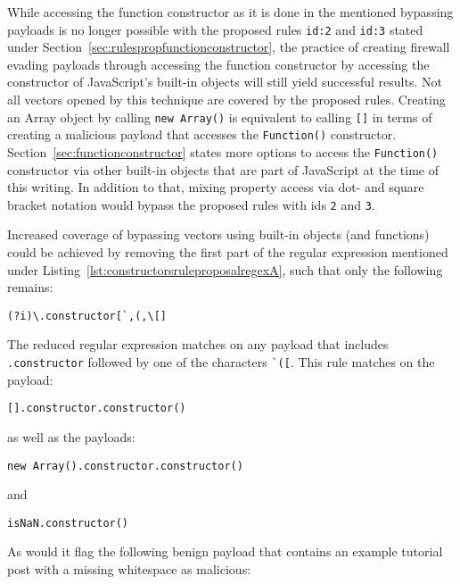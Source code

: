 While accessing the function constructor as it is done in the mentioned bypassing payloads is no longer possible with the proposed rules \verb|id:2| and \verb|id:3| stated under Section~\ref{sec:rulespropfunctionconstructor}, the practice of creating firewall evading payloads through accessing the function constructor by accessing the constructor of JavaScript's built-in objects will still yield successful results.
Not all vectors opened by this technique are covered by the proposed rules. Creating an Array object by calling \verb|new Array()| is equivalent to calling \verb|[]| in terms of creating a malicious payload that accesses the \verb|Function()| constructor.
Section~\ref{sec:functionconstructor} states more options to access the \verb|Function()| constructor via other built-in objects that are part of JavaScript at the time of this writing. In addition to that, mixing property access via dot- and square bracket notation would bypass the proposed rules with ids \verb|2| and \verb|3|.

Increased coverage of bypassing vectors using built-in objects (and functions) could be achieved by removing the first part of the regular expression mentioned under Listing~\ref{lst:constructorsruleproposalregexA}, such that only the following remains:

\begin{lstlisting}[style=basicStyle, caption=Reduced regular expression of proposed rule id:2, label={lst:propredregex}]
(?i)\.constructor[`,(,\[]
\end{lstlisting}

The reduced regular expression matches on any payload that includes \verb|.constructor| followed by one of the characters \verb|`([|. This rule matches on the payload:

\begin{lstlisting}[style=basicStyle]
[].constructor.constructor()
\end{lstlisting}

as well as the payloads:

\begin{lstlisting}[style=basicStyle]
new Array().constructor.constructor()
\end{lstlisting}

and

\begin{lstlisting}[style=basicStyle]
isNaN.constructor()
\end{lstlisting}

As would it flag the following benign payload that contains an example tutorial post with a missing whitespace as malicious:

